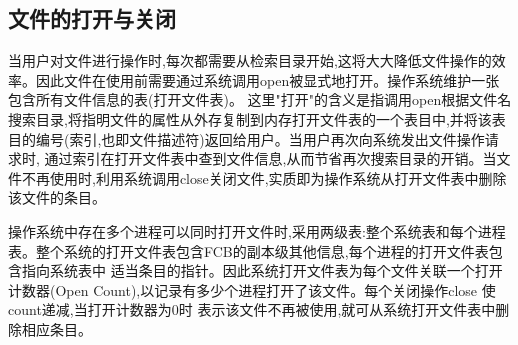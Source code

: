 \subsection{文件的打开与关闭}
当用户对文件进行操作时,每次都需要从检索目录开始,这将大大降低文件操作的效率。因此文件在使用前需要通过系统调用open被显式地打开。操作系统维护一张包含所有文件信息的表(打开文件表)。
这里"打开"的含义是指调用open根据文件名搜索目录,将指明文件的属性从外存复制到内存打开文件表的一个表目中,并将该表目的编号(索引,也即文件描述符)返回给用户。当用户再次向系统发出文件操作请求时,
通过索引在打开文件表中查到文件信息,从而节省再次搜索目录的开销。当文件不再使用时,利用系统调用close关闭文件,实质即为操作系统从打开文件表中删除该文件的条目。

操作系统中存在多个进程可以同时打开文件时,采用两级表:整个系统表和每个进程表。整个系统的打开文件表包含FCB的副本级其他信息,每个进程的打开文件表包含指向系统表中
适当条目的指针。因此系统打开文件表为每个文件关联一个打开计数器(Open Count),以记录有多少个进程打开了该文件。每个关闭操作close 使count递减,当打开计数器为0时
表示该文件不再被使用,就可从系统打开文件表中删除相应条目。